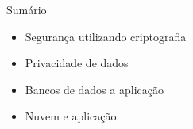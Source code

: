 
\begin{frame}{Sumário}
    \begin{itemize}
        \item Segurança utilizando criptografia
        \item Privacidade de dados
        \item Bancos de dados a aplicação
        \item Nuvem e aplicação
    \end{itemize}
\end{frame}